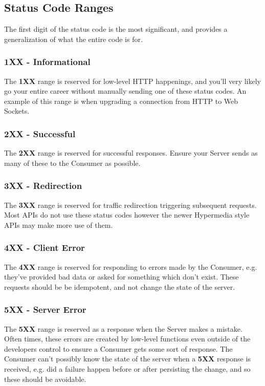 \documentclass{book}
\begin{document}
\subsection{Status Code Ranges}

The first digit of the status code is the most significant, and provides a generalization of what the entire code is for.

\subsubsection{1XX - Informational}

The \textbf{1XX} range is reserved for low-level HTTP happenings, and you'll very likely go your entire career without manually sending one of these status codes. An example of this range is when upgrading a connection from HTTP to Web Sockets.

\subsubsection{2XX - Successful}

The \textbf{2XX} range is reserved for successful responses. Ensure your Server sends as many of these to the Consumer as possible.

\subsubsection{3XX - Redirection}

The \textbf{3XX} range is reserved for traffic redirection triggering subsequent requests. Most APIs do not use these status codes however the newer Hypermedia style APIs may make more use of them.

\subsubsection{4XX - Client Error}

The \textbf{4XX} range is reserved for responding to errors made by the Consumer, e.g. they've provided bad data or asked for something which don't exist. These requests should be be idempotent, and not change the state of the server.

\subsubsection{5XX - Server Error}

The \textbf{5XX} range is reserved as a response when the Server makes a mistake. Often times, these errors are created by low-level functions even outside of the developers control to ensure a Consumer gets some sort of response. The Consumer can't possibly know the state of the server when a \textbf{5XX} response is received, e.g. did a failure happen before or after persisting the change, and so these should be avoidable.
\end{document}
